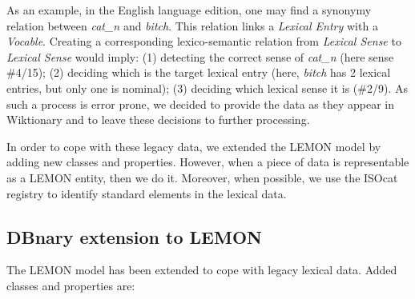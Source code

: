 \documentclass[sw]{iosart2c}
\begin{document}
As an example, in the English language edition, one may find a synonymy relation between \textit{cat\_n} and \textit{bitch}. This relation links a \textit{Lexical Entry} with a \textit{Vocable}. Creating a corresponding lexico-semantic relation from \textit{Lexical Sense} to \textit{Lexical Sense} would imply: (1) detecting the correct sense of \textit{cat\_n} (here sense \#4/15); (2) deciding which is the target lexical entry (here, \textit{bitch} has 2 lexical entries, but only one is nominal); (3) deciding which lexical sense it is (\#2/9). As such a process is error prone, we decided to provide the data as they appear in Wiktionary and to leave these decisions to further processing.

In order to cope with these legacy data, we extended the LEMON model by adding new classes and properties. However, when a piece of data is representable as a LEMON entity, then we do it. Moreover, when possible, we use the ISOcat registry \cite{windhouwer2012linking} to identify standard elements in the lexical data.

\subsection{DBnary extension to LEMON}

The LEMON model has been extended to cope with legacy lexical data. Added classes and properties are:
\end{document}
